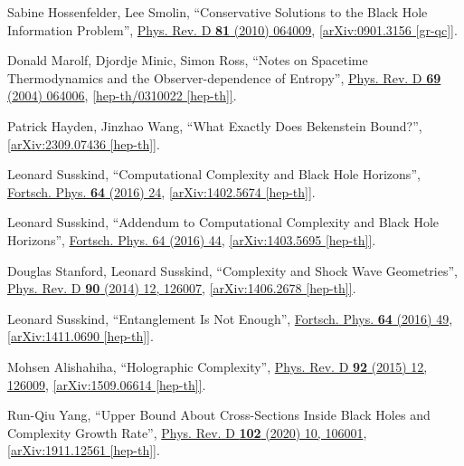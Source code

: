 \documentclass[12pt,preprintnumbers, floatfix, preprintnumbers, letterpaper, superscriptaddress,nofootinbib]{revtex4-2}
\begin{document}
\begin{thebibliography}{99}
Sabine Hossenfelder, Lee Smolin, ``Conservative Solutions to the Black Hole Information Problem'', {\href{https://journals.aps.org/prd/abstract/10.1103/PhysRevD.81.064009}{Phys. Rev. D \textbf{81} (2010) 064009}}, \href{https://arxiv.org/abs/0901.3156}{[arXiv:0901.3156 [gr-qc]]}.


Donald Marolf, Djordje Minic, Simon Ross, ``Notes on Spacetime Thermodynamics and the Observer-dependence of Entropy'',  {\href{https://journals.aps.org/prd/abstract/10.1103/PhysRevD.69.064006}{Phys. Rev. D \textbf{69} (2004) 064006}}, \href{https://arxiv.org/abs/hep-th/0310022}{[hep-th/0310022 [hep-th]]}.

Patrick Hayden, Jinzhao Wang, ``What Exactly Does Bekenstein Bound?'', \href{https://arxiv.org/abs/2309.07436}{[arXiv:2309.07436 [hep-th]]}.

Leonard Susskind, ``Computational Complexity and Black Hole Horizons'',  {\href{https://onlinelibrary.wiley.com/doi/10.1002/prop.201500092}{Fortsch. Phys. \textbf{64} (2016) 24}},  \href{https://arxiv.org/abs/1402.5674}{[arXiv:1402.5674 [hep-th]]}.

Leonard Susskind, ``Addendum to Computational Complexity and Black Hole Horizons'',  {\href{https://onlinelibrary.wiley.com/doi/10.1002/prop.201500093}{Fortsch. Phys. 64 (2016) 44}}, \href{https://arxiv.org/abs/1403.5695}{[arXiv:1403.5695 [hep-th]]}.

Douglas Stanford, Leonard Susskind, ``Complexity and Shock Wave Geometries'', {\href{https://journals.aps.org/prd/abstract/10.1103/PhysRevD.90.126007}{Phys. Rev. D \textbf{90} (2014) 12, 126007}}, \href{https://arxiv.org/abs/1406.2678}{[arXiv:1406.2678 [hep-th]]}.


Leonard Susskind, ``Entanglement Is Not Enough'', {\href{https://onlinelibrary.wiley.com/doi/10.1002/prop.201500095}{Fortsch. Phys. \textbf{64} (2016) 49}}, \href{https://arxiv.org/abs/1411.0690}{[arXiv:1411.0690 [hep-th]]}.

Mohsen Alishahiha, ``Holographic Complexity'', {\href{https://journals.aps.org/prd/abstract/10.1103/PhysRevD.92.126009}{Phys. Rev. D \textbf{92} (2015) 12, 126009}}, \href{https://arxiv.org/abs/1509.06614}{[arXiv:1509.06614 [hep-th]]}.

Run-Qiu Yang, ``Upper Bound About Cross-Sections Inside Black Holes and Complexity Growth Rate'', {\href{https://journals.aps.org/prd/abstract/10.1103/PhysRevD.102.106001}{Phys. Rev. D \textbf{102} (2020) 10, 106001}}, \href{https://arxiv.org/abs/1911.12561}{[arXiv:1911.12561 [hep-th]]}.


\end{thebibliography}
\end{document}
